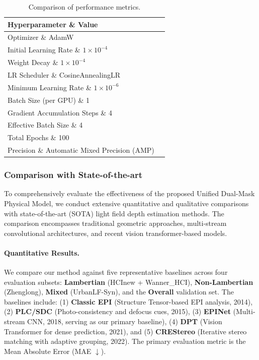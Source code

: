 \documentclass[lettersize,journal]{IEEEtran}
\begin{document}
\begin{table}[!t]
\caption{Comparison of performance metrics.}
\label{tab:comparison}
\centering
\begin{tabular}{ll}
\toprule
Hyperparameter \& Value \\
\midrule
Optimizer \& AdamW \\
Initial Learning Rate \& $1 \times 10^{-4}$ \\
Weight Decay \& $1 \times 10^{-4}$ \\
LR Scheduler \& CosineAnnealingLR \\
Minimum Learning Rate \& $1 \times 10^{-6}$ \\
Batch Size (per GPU) \& 1 \\
Gradient Accumulation Steps \& 4 \\
Effective Batch Size \& 4 \\
Total Epochs \& 100 \\
Precision \& Automatic Mixed Precision (AMP) \\
\bottomrule
\end{tabular}
\end{table}
\subsubsection{Comparison with State-of-the-art}

To comprehensively evaluate the effectiveness of the proposed Unified Dual-Mask Physical Model, we conduct extensive quantitative and qualitative comparisons with state-of-the-art (SOTA) light field depth estimation methods. The comparison encompasses traditional geometric approaches, multi-stream convolutional architectures, and recent vision transformer-based models. 

\paragraph{Quantitative Results.}

We compare our method against five representative baselines across four evaluation subsets: \textbf{Lambertian} (HCInew + Wanner\_HCI), \textbf{Non-Lambertian} (Zhenglong), \textbf{Mixed} (UrbanLF-Syn), and the \textbf{Overall} validation set. The baselines include: (1) \textbf{Classic EPI} (Structure Tensor-based EPI analysis, 2014), (2) \textbf{PLC/SDC} (Photo-consistency and defocus cues, 2015), (3) \textbf{EPINet} (Multi-stream CNN, 2018, serving as our primary baseline), (4) \textbf{DPT} (Vision Transformer for dense prediction, 2021), and (5) \textbf{CREStereo} (Iterative stereo matching with adaptive grouping, 2022). The primary evaluation metric is the Mean Absolute Error (MAE $\downarrow$). 
\end{document}
